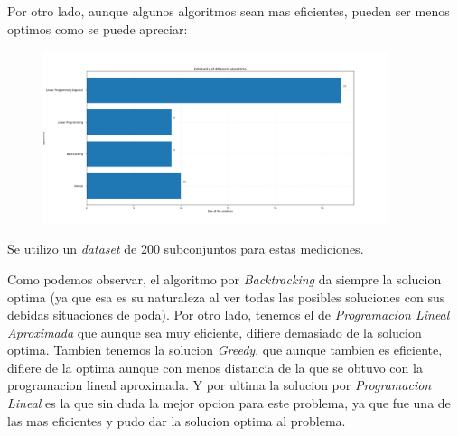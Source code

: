 Por otro lado, aunque algunos algoritmos sean mas eficientes, pueden ser menos optimos como se puede apreciar:

\begin{figure}[H]
	\centering
	\includegraphics[width=0.9\textwidth]{img/comparison.png}
\end{figure}

Se utilizo un \textit{dataset} de 200 subconjuntos para estas mediciones.

Como podemos observar, el algoritmo por \textit{Backtracking} da siempre la solucion optima (ya que esa es su naturaleza al ver todas las posibles soluciones con sus debidas situaciones de poda). Por otro lado, tenemos el de \textit{Programacion Lineal Aproximada} que aunque sea muy eficiente, difiere demasiado de la solucion optima. Tambien tenemos la solucion \textit{Greedy}, que aunque tambien es eficiente, difiere de la optima aunque con menos distancia de la que se obtuvo con la programacion lineal aproximada. Y por ultima la solucion por \textit{Programacion Lineal} es la que sin duda la mejor opcion para este problema, ya que fue una de las mas eficientes y pudo dar la solucion optima al problema.